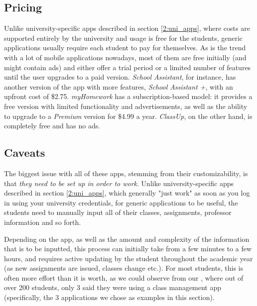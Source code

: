     \subsection{Pricing} \label{2:generic_apps_pricing}
        Unlike university-specific apps described in section \ref{2:uni_apps}, where costs are supported entirely by the university and usage is free for the students, generic applications usually require each student to pay for themselves. As is the trend with a lot of mobile applications nowadays, most of them are free initially (and might contain ads) and either offer a trial period or a limited number of features until the user upgrades to a paid version. \textit{School Assistant}, for instance, has another version of the app with more features, \textit{School Assistant +}, with an upfront cost of \$2.75. \textit{myHomework} has a subscription-based model: it provides a free version with limited functionality and advertisements, as well as the ability to upgrade to a \textit{Premium} version for \$4.99 a year. \textit{ClassUp}, on the other hand, is completely free and has no ads.
        
    \subsection{Caveats} \label{2:generic_apps_caveats}
        The biggest issue with all of these apps, stemming from their customizability, is that \textit{they need to be set up in order to work}. Unlike university-specific apps described in section \ref{2:uni_apps}, which generally "just work" as soon as you log in using your university credentials, for generic applications to be useful, the students need to manually input all of their classes, assignments, professor information and so forth. 
        
        Depending on the app, as well as the amount and complexity of the information that is to be inputted, this process can initially take from a few minutes to a few hours, and requires active updating by the student throughout the academic year (as new assignments are issued, classes change etc.). For most students, this is often more effort than it is worth, as we could observe from our \textbf{}, where out of over 200 students, only 3 said they were using a class management app (specifically, the 3 applications we chose as examples in this section).
        

